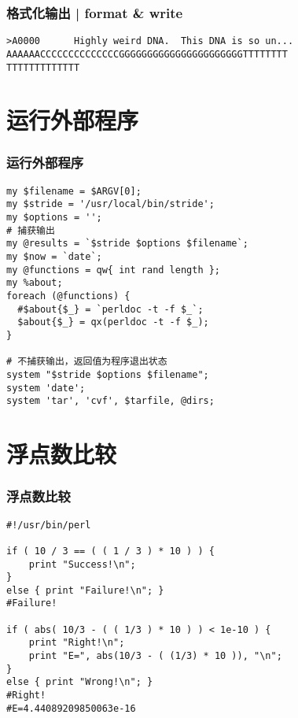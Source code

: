 \begin{frame}[fragile]
  \frametitle{格式化输出 | format \& write}
\begin{lstlisting}[basicstyle=\footnotesize\tt,numberstyle=\scriptsize]
>A0000      Highly weird DNA.  This DNA is so un...
AAAAAACCCCCCCCCCCCCCGGGGGGGGGGGGGGGGGGGGGGTTTTTTTT
TTTTTTTTTTTTT
\end{lstlisting}
\end{frame}

\section{运行外部程序}
\begin{frame}[fragile]
  \frametitle{运行外部程序}
\begin{lstlisting}[basicstyle=\small\tt]
my $filename = $ARGV[0];
my $stride = '/usr/local/bin/stride';
my $options = '';
# 捕获输出
my @results = `$stride $options $filename`;
my $now = `date`;
my @functions = qw{ int rand length };
my %about;
foreach (@functions) {
  #$about{$_} = `perldoc -t -f $_`;
  $about{$_} = qx(perldoc -t -f $_);
}

# 不捕获输出，返回值为程序退出状态
system "$stride $options $filename";
system 'date';
system 'tar', 'cvf', $tarfile, @dirs;
\end{lstlisting}
\end{frame}

\section{浮点数比较}
\begin{frame}[fragile]
  \frametitle{浮点数比较}
\begin{lstlisting}[basicstyle=\small\tt]
#!/usr/bin/perl

if ( 10 / 3 == ( ( 1 / 3 ) * 10 ) ) {
    print "Success!\n";
}
else { print "Failure!\n"; }
#Failure!

if ( abs( 10/3 - ( ( 1/3 ) * 10 ) ) < 1e-10 ) {
    print "Right!\n";
    print "E=", abs(10/3 - ( (1/3) * 10 )), "\n";
}
else { print "Wrong!\n"; }
#Right!
#E=4.44089209850063e-16
\end{lstlisting}
\end{frame}

